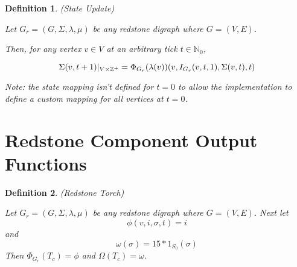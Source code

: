 \documentclass{article}
\newtheorem{defn}{Definition}[section]
\begin{document}
\begin{defn} (State Update)

Let \(G_{r} = (G, \Sigma, \lambda, \mu)\) be any redstone digraph where \(G = (V, E)\).

Then, for any vertex \(v \in V\) at an arbitrary tick \(t \in \mathbb{N}_{0}\),

\begin{equation}
	\Sigma(v, t + 1)|_{V \times \mathbb{Z}^+} = \Phi_{G_{r}}(\lambda(v))(v, I_{G_{r}}(v, t, 1), \Sigma(v, t), t) \\
\end{equation}

Note: the state mapping isn't defined for \(t = 0\) to allow the implementation to define a custom mapping for all 
vertices at \(t = 0\).

\end{defn}

\section{Redstone Component Output Functions}

\begin{defn} (Redstone Torch)

	Let \(G_{r} = (G, \Sigma, \lambda, \mu)\) be any redstone digraph where \(G = (V, E)\).
	Next let
	\begin{equation}
		\phi(v, i, \sigma, t) = i 
	\end{equation}
	and
	\begin{equation}
		\omega(\sigma) = 15 * 1_{S_{0}}(\sigma)
	\end{equation}
	Then \(\Phi_{G_{r}}(T_{c}) = \phi\) and \(\Omega(T_{c}) = \omega\).
\end{defn}
\end{document}
